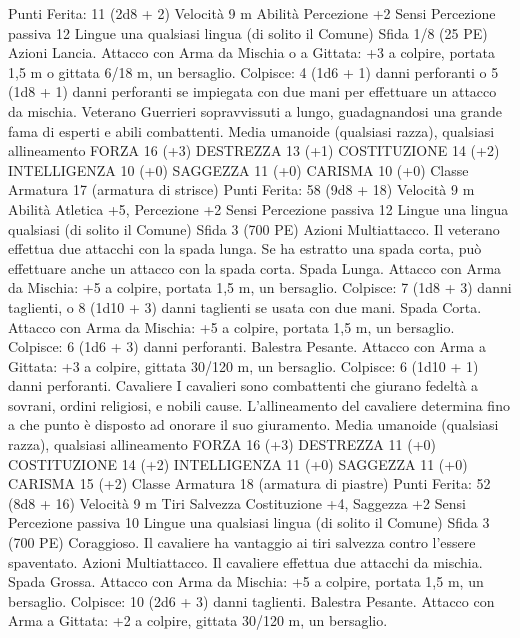 \begin{multicols}{2}
\hspace*{0pt}\hfill{Punti Ferita}: 11 (2d8 + 2)
Velocità 9 m
Abilità Percezione +2
Sensi Percezione passiva 12
Lingue una qualsiasi lingua (di solito il Comune)
Sfida 1/8 (25 PE)
Azioni
Lancia. Attacco con Arma da Mischia o a Gittata: +3 a colpire,
portata 1,5 m o gittata 6/18 m, un bersaglio.
Colpisce: 4 (1d6 + 1) danni perforanti o 5 (1d8 + 1) danni
perforanti se impiegata con due mani per effettuare un attacco da
mischia.
Veterano
Guerrieri sopravvissuti a lungo, guadagnandosi una
grande fama di esperti e abili combattenti.
Media umanoide (qualsiasi razza), qualsiasi allineamento
FORZA 16 (+3)
DESTREZZA 13 (+1)
COSTITUZIONE 14 (+2)
INTELLIGENZA 10 (+0)
SAGGEZZA 11 (+0)
CARISMA 10 (+0)
Classe Armatura 17 (armatura di strisce)
\hspace*{0pt}\hfill{Punti Ferita}: 58 (9d8 + 18)
Velocità 9 m
Abilità Atletica +5, Percezione +2
Sensi Percezione passiva 12
Lingue una lingua qualsiasi (di solito il Comune)
Sfida 3 (700 PE)
Azioni
Multiattacco. Il veterano effettua due attacchi con la spada
lunga. Se ha estratto una spada corta, può effettuare anche un
attacco con la spada corta.
Spada Lunga. Attacco con Arma da Mischia: +5 a colpire,
portata 1,5 m, un bersaglio.
Colpisce: 7 (1d8 + 3) danni taglienti, o 8 (1d10 + 3) danni
taglienti se usata con due mani.
Spada Corta. Attacco con Arma da Mischia: +5 a colpire, portata
1,5 m, un bersaglio.
Colpisce: 6 (1d6 + 3) danni perforanti.
Balestra Pesante. Attacco con Arma a Gittata: +3 a colpire,
gittata 30/120 m, un bersaglio.
Colpisce: 6 (1d10 + 1) danni perforanti.
Cavaliere
I cavalieri sono combattenti che giurano fedeltà a
sovrani, ordini religiosi, e nobili cause. L’allineamento
del cavaliere determina fino a che punto è disposto ad
onorare il suo giuramento.
Media umanoide (qualsiasi razza), qualsiasi allineamento
FORZA 16 (+3)
DESTREZZA 11 (+0)
COSTITUZIONE 14 (+2)
INTELLIGENZA 11 (+0)
SAGGEZZA 11 (+0)
CARISMA 15 (+2)
Classe Armatura 18 (armatura di piastre)
\hspace*{0pt}\hfill{Punti Ferita}: 52 (8d8 + 16)
Velocità 9 m
Tiri Salvezza Costituzione +4, Saggezza +2
Sensi Percezione passiva 10
Lingue una qualsiasi lingua (di solito il Comune)
Sfida 3 (700 PE)
Coraggioso. Il cavaliere ha vantaggio ai tiri salvezza contro
l’essere spaventato.
Azioni
Multiattacco. Il cavaliere effettua due attacchi da mischia.
Spada Grossa. Attacco con Arma da Mischia: +5 a colpire,
portata 1,5 m, un bersaglio.
Colpisce: 10 (2d6 + 3) danni taglienti.
Balestra Pesante. Attacco con Arma a Gittata: +2 a colpire,
gittata 30/120 m, un bersaglio.

\end{multicols}
